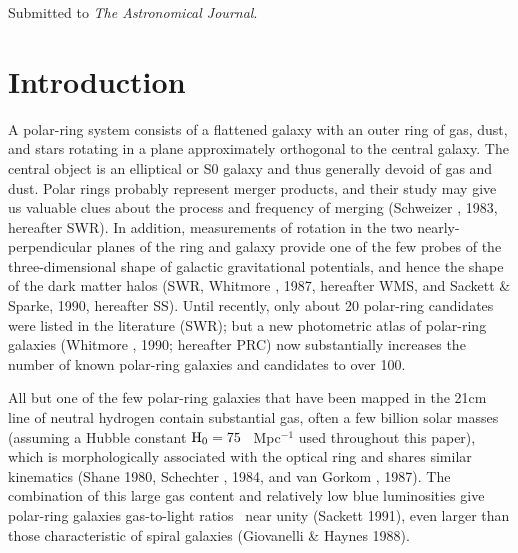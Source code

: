 \vspace{0.75in}
\noindent Submitted to {\it The Astronomical Journal\/}.

\vfil\eject

\section{Introduction}
\medskip

A polar-ring system consists of a flattened galaxy with an outer ring of gas,
dust, and stars rotating in a plane approximately orthogonal to the central
galaxy.  The central object is an elliptical or S0 galaxy and 
thus generally devoid of gas and dust.  
Polar rings probably represent merger products, and their study
may give us valuable clues about the process and frequency of merging
(Schweizer \etal, 1983, hereafter SWR).  
In addition, measurements of rotation in
the two nearly-perpendicular planes of the ring and galaxy provide one of the
few probes of the three-dimensional shape of galactic gravitational
potentials, and hence the shape of the dark matter halos 
(SWR, Whitmore \etal, 1987, hereafter WMS, and 
Sackett \& Sparke, 1990, hereafter SS).  
Until recently, only about 20 polar-ring candidates were 
listed in the literature (SWR); 
but a new photometric atlas of polar-ring galaxies (Whitmore \etal, 1990; 
hereafter PRC) now substantially increases the number of 
known polar-ring galaxies and candidates to over 100. 

All but one of the few polar-ring galaxies that have been mapped 
in the 21cm line of neutral hydrogen contain substantial gas,
often a few billion solar masses
(assuming a Hubble constant $\rm H_0 = 75$ \KMS \ Mpc$^{-1}$ used 
throughout this paper),
which is morphologically associated 
with the optical ring and shares similar kinematics (Shane 1980,
Schechter \etal, 1984, and van Gorkom \etal, 1987).   The combination of 
this large gas content and relatively low blue luminosities give
polar-ring galaxies gas-to-light ratios \MHILB\ near unity
(Sackett 1991), even larger than those characteristic of spiral galaxies  
(Giovanelli \& Haynes 1988). 

